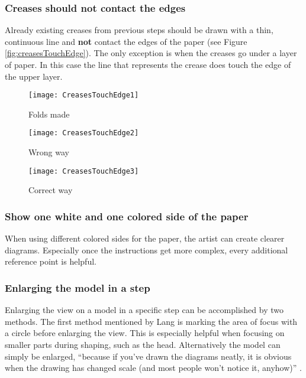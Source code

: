 \subsubsection*{Creases should not contact the edges}
Already existing creases from previous steps should be drawn with a thin, continuous line and \textbf{not} contact the edges of the paper (see Figure \ref{fig:creasesTouchEdge}). The only exception is when the creases go under a layer of paper. In this case the line that represents the crease does touch the edge of the upper layer.
\begin{figure*}[htbp]
    \centering
    \begin{subfigure}{0.3\textwidth}
        \texttt{[image: CreasesTouchEdge1]}
        \caption{Folds made}
        \label{fig:creasesTouchEdge1}
    \end{subfigure}
    \begin{subfigure}{0.3\textwidth}
        \texttt{[image: CreasesTouchEdge2]}
        \caption{Wrong way}
        \label{fig:creasesTouchEdge2}
    \end{subfigure}
    \begin{subfigure}{0.3\textwidth}
        \texttt{[image: CreasesTouchEdge3]}
        \caption{Correct way}
        \label{fig:creasesTouchEdge3}
    \end{subfigure}
    \caption{How to draw existing creases}\label{fig:creasesTouchEdge}
\end{figure*}

\subsubsection*{Show one white and one colored side of the paper}
When using different colored sides for the paper, the artist can create clearer diagrams. Especially once the instructions get more complex, every additional reference point is helpful.

\subsubsection*{Enlarging the model in a step}
Enlarging the view on a model in a specific step can be accomplished by two methods. The first method mentioned by Lang is marking the area of focus with a circle before enlarging the view. This is especially helpful when focusing on smaller parts during shaping, such as the head. Alternatively the model can simply be enlarged, \enquote{because if you've drawn the diagrams neatly, it is obvious when the drawing has changed scale (and most people won't notice it, anyhow)} \cite{Lang}.


